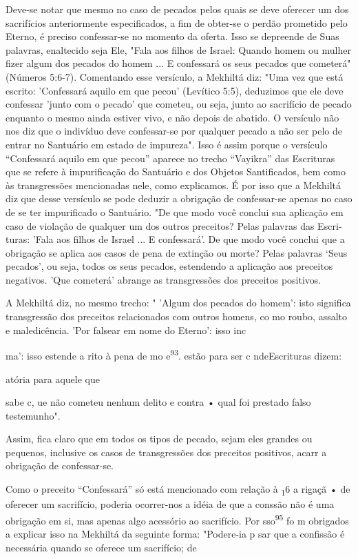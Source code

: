 Deve-se notar que mesmo no caso de pecados pelos quais se deve oferecer
um dos sacrifícios anteriormente especificados, a fim de obter-se o
per­dão prometido pelo Eterno, é preciso confessar-se no momento da
oferta. Isso se depreende de Suas palavras, enaltecido seja Ele, "Fala
aos filhos de Israel: Quando homem ou mulher fizer algum dos pecados do
homem ... E confes­sará os seus pecados que cometerá" (Números 5:6-7).
Comentando esse versí­culo, a Mekhiltá diz: "Uma vez que está escrito:
'Confessará aquilo em que pe­cou' (Levítico 5:5), deduzimos que ele deve
confessar 'junto com o pecado' que cometeu, ou seja, junto ao sacrifício
de pecado enquanto o mesmo ainda estiver vivo, e não depois de abatido.
O versículo não nos diz que o indivíduo deve confessar-se por qualquer
pecado a não ser pelo de entrar no Santuário em estado de impureza".
Isso é assim porque o versículo ``Confessará aquilo em que pecou'' aparece
no trecho ``Vayikra'' das Escrituras que se refere à im­purificação do
Santuário e dos Objetos Santificados, bem como às transgres­sões
mencionadas nele, como explicamos. É por isso que a Mekhiltá diz que
desse versículo se pode deduzir a obrigação de confessar-se apenas no
caso de se ter impurificado o Santuário. "De que modo você conclui sua
aplicação em caso de violação de qualquer um dos outros preceitos? Pelas
palavras das Escri­turas: 'Fala aos filhos de Israel ... E confessará'.
De que modo você conclui que a obrigação se aplica aos casos de pena de
extinção ou morte? Pelas palavras `Seus pecados', ou seja, todos os seus
pecados, estendendo a aplicação aos preceitos negativos. 'Que cometerá'
abrange as transgressões dos preceitos positivos.

A Mekhiltá diz, no mesmo trecho: " 'Algum dos pecados do homem': isto
significa transgressão dos preceitos relacionados com outros homens, co
mo roubo, assalto e maledicência. 'Por falsear em nome do Eterno': isso
inc


ma': isso estende a ri­to à pena de mo e\textsuperscript{93}. estão para
ser c nde­Escrituras dizem:

atória para aquele que

sabe c, ue não cometeu nenhum delito e contra • qual foi prestado falso
testemunho".

Assim, fica claro que em todos os tipos de pecado, sejam eles gran­des
ou pequenos, inclusive os casos de transgressões dos preceitos
positivos, acarr a obrigação de confessar-se.

Como o preceito ``Confessará'' só está mencionado com relação à
\textsubscript{1}6 a rigaçã • de oferecer um sacrifício, poderia
ocorrer-nos a idéia de que a con­ssão não é uma obrigação em si, mas
apenas algo acessório ao sacrifício. Por sso\textsuperscript{95} fo m
obrigados a explicar isso na Mekhiltá da seguinte forma: "Poder­e-ia p
sar que a confissão é necessária quando se oferece um sacrifício; de


